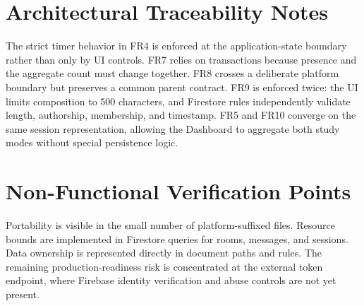 \section{Architectural Traceability Notes}
The strict timer behavior in FR4 is enforced at the application-state boundary rather than only by UI controls. FR7 relies on transactions because presence and the aggregate count must change together. FR8 crosses a deliberate platform boundary but preserves a common parent contract. FR9 is enforced twice: the UI limits composition to 500 characters, and Firestore rules independently validate length, authorship, membership, and timestamp. FR5 and FR10 converge on the same session representation, allowing the Dashboard to aggregate both study modes without special persistence logic.

\section{Non-Functional Verification Points}
Portability is visible in the small number of platform-suffixed files. Resource bounds are implemented in Firestore queries for rooms, messages, and sessions. Data ownership is represented directly in document paths and rules. The remaining production-readiness risk is concentrated at the external token endpoint, where Firebase identity verification and abuse controls are not yet present.
